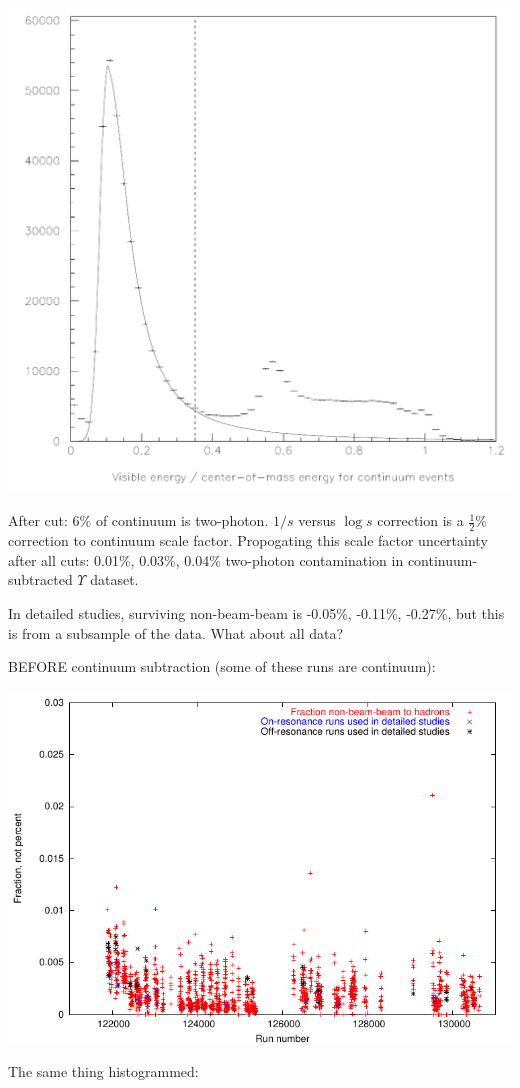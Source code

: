\documentclass[landscape]{article}
\begin{document}
\huge
\renewcommand{\labelitemi}{-}
\setlength{\parindent}{0 cm}

\includegraphics[width=0.7\linewidth]{twophoton_leakage.pdf}

After cut: 6\% of continuum is two-photon.  $1/s$ versus $\log s$
correction is a $\frac{1}{2}$\% correction to continuum scale factor.
Propogating this scale factor uncertainty after all cuts: 0.01\%,
0.03\%, 0.04\% two-photon contamination in continuum-subtracted
$\Upsilon$ dataset.

\pagebreak

In detailed studies, surviving non-beam-beam is -0.05\%, -0.11\%,
-0.27\%, but this is from a subsample of the data.  What about all
data?

\vfill
BEFORE continuum subtraction (some of these runs are continuum):

\includegraphics[width=0.7\linewidth]{non-beam-beam.pdf}

\pagebreak

The same thing histogrammed:
\end{document}
